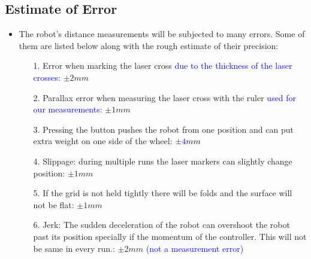     
    {
    \subsection{Estimate of Error}
    
        \begin{itemize}
            \item The robot's distance measurements will be subjected to many errors. Some of them are listed below along with the rough estimate of their precision:
            
            \begin{itemize}
                \item[1.] Error when marking the laser cross \textcolor{blue}{due to the thickness of the laser crosses:}  $\pm 2mm$
                
                \item[2.] Parallax error when measuring the laser cross with the ruler \textcolor{blue}{used for our measurements:} $\pm 1mm$
                
                \item[3.] Pressing the button pushes the robot from one position and can put extra weight on one side of the wheel\textcolor{blue}{:} $\pm \textcolor{blue}{4 } mm$
                
                \item[4.] Slippage: during multiple runs the laser markers can slightly change position\textcolor{blue}{:} $\pm 1mm$
                
                \item[5.] If the grid is not held tightly there will be folds and the surface will not be flat\textcolor{blue}{:} $\pm 1mm$
                
                \item[6.] Jerk: The sudden deceleration of the robot can overshoot the robot past its position specially if the momentum of the controller. This will not be same in every run.\textcolor{blue}{:} $\pm 2mm$ \textcolor{blue}{(not a measurement error)}
            \end{itemize}
            
        \end{itemize}
    
    
    
    
    
    }
    
